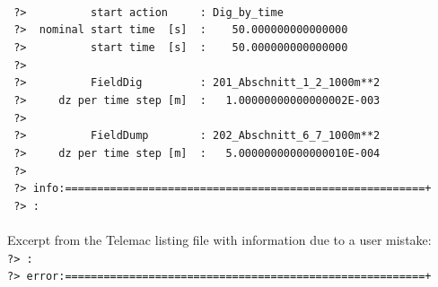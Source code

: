   \\ \hspace*{3mm} \texttt{\small{~?>~~~~~~~~~~start~action~~~~~:~Dig\_by\_time~~~~~~~~~~~~~~~~~~~~~~~}}
  \\ \hspace*{3mm} \texttt{\small{~?>~~nominal~start~time~~[s]~~:~~~~50.000000000000000~~~~~~~~~~~~~}}
  \\ \hspace*{3mm} \texttt{\small{~?>~~~~~~~~~~start~time~~[s]~~:~~~~50.000000000000000~~~~~~~~~~~~~}}
  \\ \hspace*{3mm} \texttt{\small{~?>~~~~~~~~~~~~~~~~~~~~~~~~~~~~~~~~~~~~~~~~~~~~~~~~~~~~~~~~~~~~~~~}}
  \\ \hspace*{3mm} \texttt{\small{~?>~~~~~~~~~~FieldDig~~~~~~~~~:~201\_Abschnitt\_1\_2\_1000m**2~~~~~~~~}}
  \\ \hspace*{3mm} \texttt{\small{~?>~~~~~dz~per~time~step~[m]~~:~~~1.00000000000000002E-003~~~~~~~~}}
  \\ \hspace*{3mm} \texttt{\small{~?>~~~~~~~~~~~~~~~~~~~~~~~~~~~~~~~~~~~~~~~~~~~~~~~~~~~~~~~~~~~~~~~}}
  \\ \hspace*{3mm} \texttt{\small{~?>~~~~~~~~~~FieldDump~~~~~~~~:~202\_Abschnitt\_6\_7\_1000m**2~~~~~~~~}}
  \\ \hspace*{3mm} \texttt{\small{~?>~~~~~dz~per~time~step~[m]~~:~~~5.00000000000000010E-004~~~~~~~~}}
  \\ \hspace*{3mm} \texttt{\small{~?>~~~~~~~~~~~~~~~~~~~~~~~~~~~~~~~~~~~~~~~~~~~~~~~~~~~~~~~~~~~~~~~}}
  \\ \hspace*{3mm} \texttt{\small{~?>~info:========================================================+}}
  \\ \hspace*{3mm} \texttt{\small{~?>~:}}\\
\\Excerpt from the Telemac listing file with information due to a user mistake:
  \\ \hspace*{3mm} \texttt{\small{?>~:}}
  \\ \hspace*{3mm} \texttt{\small{?>~error:========================================================+}}
